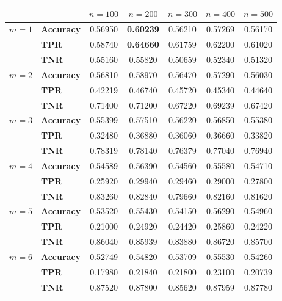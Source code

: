 \begin{figure}
    \centering
    \begin{tabular}{c|lccccc}
               &                   & $n=100$ & $n=200$ & $n=300$ & $n=400$ & $n=500$ \\
        \hline
        $m=1$  & \textbf{Accuracy} & 0.56950 & \textbf{0.60239} & 0.56210 & 0.57269 & 0.56170 \\
               & \textbf{TPR}      & 0.58740 & \textbf{0.64660} & 0.61759 & 0.62200 & 0.61020 \\
               & \textbf{TNR}      & 0.55160 & 0.55820 & 0.50659 & 0.52340 & 0.51320 \\
        \hline
        $m=2$  & \textbf{Accuracy} & 0.56810 & 0.58970 & 0.56470 & 0.57290 & 0.56030 \\
               & \textbf{TPR}      & 0.42219 & 0.46740 & 0.45720 & 0.45340 & 0.44640 \\
               & \textbf{TNR}      & 0.71400 & 0.71200 & 0.67220 & 0.69239 & 0.67420 \\
        \hline
        $m=3$  & \textbf{Accuracy} & 0.55399 & 0.57510 & 0.56220 & 0.56850 & 0.55380 \\
               & \textbf{TPR}      & 0.32480 & 0.36880 & 0.36060 & 0.36660 & 0.33820 \\
               & \textbf{TNR}      & 0.78319 & 0.78140 & 0.76379 & 0.77040 & 0.76940 \\
        \hline
        $m=4$  & \textbf{Accuracy} & 0.54589 & 0.56390 & 0.54560 & 0.55580 & 0.54710 \\
               & \textbf{TPR}      & 0.25920 & 0.29940 & 0.29460 & 0.29000 & 0.27800 \\
               & \textbf{TNR}      & 0.83260 & 0.82840 & 0.79660 & 0.82160 & 0.81620 \\
        \hline
        $m=5$  & \textbf{Accuracy} & 0.53520 & 0.55430 & 0.54150 & 0.56290 & 0.54960 \\
               & \textbf{TPR}      & 0.21000 & 0.24920 & 0.24420 & 0.25860 & 0.24220 \\
               & \textbf{TNR}      & 0.86040 & 0.85939 & 0.83880 & 0.86720 & 0.85700 \\
        \hline
        $m=6$  & \textbf{Accuracy} & 0.52749 & 0.54820 & 0.53709 & 0.55530 & 0.54260 \\
               & \textbf{TPR}      & 0.17980 & 0.21840 & 0.21800 & 0.23100 & 0.20739 \\
               & \textbf{TNR}      & 0.87520 & 0.87800 & 0.85620 & 0.87959 & 0.87780 \\

\end{tabular}
\end{figure}
